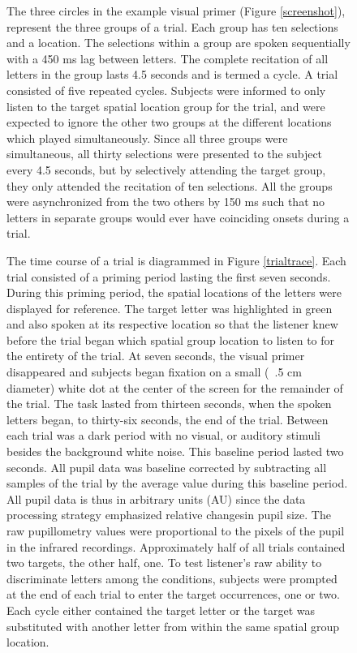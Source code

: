 \documentclass[10pt]{article}
\begin{document}
\begin{figure}
The three circles in the example visual primer (Figure
\ref{screenshot}), represent the three groups of a trial.
Each group has ten selections and a location.  The selections
within a group are spoken sequentially with a 450 ms lag
between letters.  The complete recitation of all letters in
the group lasts 4.5 seconds and is termed a cycle.  A trial
consisted of five repeated cycles. Subjects were informed to
only listen to the target spatial location group for the
trial, and were expected to ignore the other two groups at the
different locations which played simultaneously. Since all
three groups were simultaneous, all thirty selections were
presented to the subject every 4.5 seconds, but by selectively
attending the target group, they only attended the recitation
of ten selections. All the groups were asynchronized from the
two others by 150 ms such that no letters in separate groups
would ever have coinciding onsets during a trial.

The time course of a trial is diagrammed in Figure
\ref{trialtrace}.  Each trial consisted of a priming period
lasting the first seven seconds.  During this priming period,
the spatial locations of the letters were displayed for
reference.  The target letter was highlighted in green and
also spoken at its respective location so that the listener
knew before the trial began which spatial group location to
listen to for the entirety of the trial. At seven seconds, the
visual primer disappeared and subjects began fixation on a
small (~.5 cm diameter) white dot at the center of the screen
for the remainder of the trial.  The task lasted from thirteen
seconds, when the spoken letters began, to thirty-six seconds,
the end of the trial.  Between each trial was a dark period
with no visual, or auditory stimuli besides the background
white noise. This baseline period lasted two seconds.  All
pupil data was baseline corrected by subtracting all samples
of the trial by the average value during this baseline period.
All pupil data is thus in arbitrary units (AU) since the data
processing strategy emphasized relative changesin pupil size.
The raw pupillometry values were proportional to the pixels of
the pupil in the infrared recordings.  Approximately half of
all trials contained two targets, the other half, one. To test
listener's raw ability to discriminate letters among the
conditions, subjects were prompted at the end of each trial to
enter the target occurrences, one or two. Each cycle either
contained the target letter or the target was substituted with
another letter from within the same spatial group location.


\end{figure}
\end{document}
